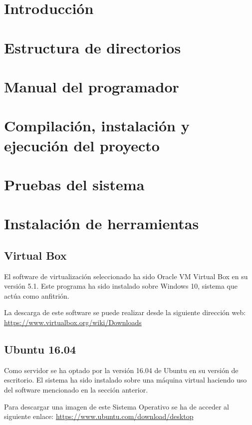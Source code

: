 
\section{Introducción}

\section{Estructura de directorios}

\section{Manual del programador}

\section{Compilación, instalación y ejecución del proyecto}

\section{Pruebas del sistema}

\section{Instalación de herramientas}

\subsection{Virtual Box}
El software de virtualización seleccionado ha sido Oracle VM Virtual Box en su versión 5.1. Este programa ha sido instalado sobre Windows 10, sistema que actúa como anfitrión.

La descarga de este software se puede realizar desde la siguiente dirección web: \url{https://www.virtualbox.org/wiki/Downloads}

\subsection{Ubuntu 16.04}
Como servidor se ha optado por la versión 16.04 de Ubuntu en su versión de escritorio. El sistema ha sido instalado sobre una máquina virtual haciendo uso del software mencionado en la sección anterior.

Para descargar una imagen de este Sistema Operativo se ha de acceder al siguiente enlace: \url{https://www.ubuntu.com/download/desktop}


